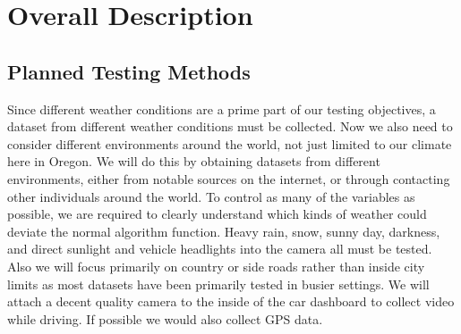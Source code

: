 \documentclass[10pt,draftclsnofoot,onecolumn,journal,compsoc]{IEEEtran}
\begin{document}




\section{Overall Description}
    \subsection{Planned Testing Methods}

    Since different weather conditions are a prime part of our testing objectives, a dataset from different weather conditions must be collected. 
    Now we also need to consider different environments around the world, not just limited to our climate here in Oregon. 
    We will do this by obtaining datasets from different environments, either from notable sources on the internet, or through contacting other individuals around the world. 
    To control as many of the variables as possible, we are required to clearly understand which kinds of weather could deviate the normal algorithm function. 
    Heavy rain, snow, sunny day, darkness, and direct sunlight and vehicle headlights into the camera all must be tested.
    Also we will focus primarily on country or side roads rather than inside city limits as most datasets have been primarily tested in busier settings. 
    We will attach a decent quality camera to the inside of the car dashboard to collect video while driving.
    If possible we would also collect GPS data.
\end{document}
